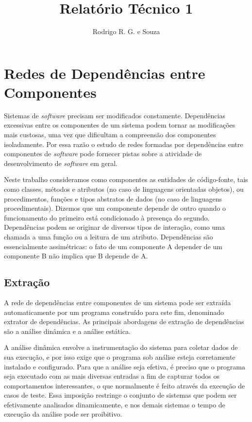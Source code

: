 \documentclass{article}
\begin{document}
\title{Relatório Técnico 1}
\author{Rodrigo R. G. e Souza}
\maketitle

\section{Redes de Dependências entre Componentes}

Sistemas de \textit{software} precisam ser modificados constamente. Dependências excessivas entre os componentes de um sistema podem tornar as modificações mais custosas, uma vez que dificultam a compreensão dos componentes isoladamente. Por essa razão o estudo de redes formadas por dependências entre componentes de \textit{software} pode fornecer pistas sobre a atividade de desenvolvimento de \textit{software} em geral.

Neste trabalho consideramos como componentes as entidades de código-fonte, tais como classes, métodos e atributos (no caso de linguagens orientadas objetos), ou procedimentos, funções e tipos abstratos de dados (no caso de linguagens procedimentais). Dizemos que um componente depende de outro quando o funcionamento do primeiro está condicionado à presença do segundo. Dependências podem se originar de diversos tipos de interação, como uma chamada a uma função ou a leitura de um atributo. Dependências são essencialmente assimétricas: o fato de um componente A depender de um componente B não implica que B depende de A.


\subsection{Extração}

A rede de dependências entre componentes de um sistema pode ser extraída automaticamente por um programa construído para este fim, denominado extrator de dependências. As principais abordagens de extração de dependências são a análise dinâmica e a análise estática. 

A análise dinâmica envolve a instrumentação do sistema para coletar dados de sua execução, e por isso exige que o programa sob análise esteja corretamente instalado e configurado. Para que a análise seja efetiva, é preciso que o programa seja executado com as mais diversas entradas a fim de capturar todos os comportamentos interessantes, o que normalmente é feito através da execução de casos de teste. Essa imposição restringe o conjunto de sistemas que podem ser efetivamente analisados dinamicamente, e nos demais sistemas o tempo de execução da análise pode ser proibitivo.
\end{document}

